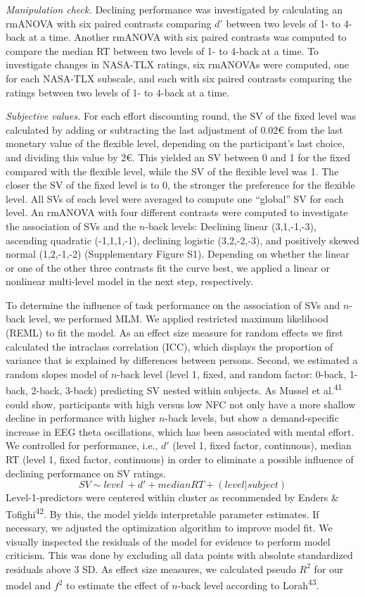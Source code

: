 \documentclass[
  man,floatsintext]{apa6}
\begin{document}
\emph{Manipulation check.}
Declining performance was investigated by calculating an rmANOVA with six paired contrasts comparing \(d'\) between two levels of 1- to 4-back at a time.
Another rmANOVA with six paired contrasts was computed to compare the median RT between two levels of 1- to 4-back at a time.
To investigate changes in NASA-TLX ratings, six rmANOVAs were computed, one for each NASA-TLX subscale, and each with six paired contrasts comparing the ratings between two levels of 1- to 4-back at a time.

\emph{Subjective values.}
For each effort discounting round, the SV of the fixed level was calculated by adding or subtracting the last adjustment of 0.02€ from the last monetary value of the flexible level, depending on the participant's last choice, and dividing this value by 2€.
This yielded an SV between 0 and 1 for the fixed compared with the flexible level, while the SV of the flexible level was 1.
The closer the SV of the fixed level is to 0, the stronger the preference for the flexible level.
All SVs of each level were averaged to compute one ``global'' SV for each level.
An rmANOVA with four different contrasts were computed to investigate the association of SVs and the \(n\)-back levels: Declining linear (3,1,-1,-3), ascending quadratic (-1,1,1,-1), declining logistic (3,2,-2,-3), and positively skewed normal (1,2,-1,-2) (Supplementary Figure S1).
Depending on whether the linear or one of the other three contrasts fit the curve best, we applied a linear or nonlinear multi-level model in the next step, respectively.

To determine the influence of task performance on the association of SVs and \(n\)-back level, we performed MLM.
We applied restricted maximum likelihood (REML) to fit the model.
As an effect size measure for random effects we first calculated the intraclass correlation (ICC), which displays the proportion of variance that is explained by differences between persons.
Second, we estimated a random slopes model of \(n\)-back level (level 1, fixed, and random factor: 0-back, 1-back, 2-back, 3-back) predicting SV nested within subjects.
As Mussel et al.\textsuperscript{41} could show, participants with high versus low NFC not only have a more shallow decline in performance with higher \(n\)-back levels, but show a demand-specific increase in EEG theta oscillations, which has been associated with mental effort.
We controlled for performance, i.e., \(d'\) (level 1, fixed factor, continuous), median RT (level 1, fixed factor, continuous) in order to eliminate a possible influence of declining performance on SV ratings.
\[
SV \sim level\ + d' + median RT + (level|subject)
\]
Level-1-predictors were centered within cluster as recommended by Enders \& Tofighi\textsuperscript{42}.
By this, the model yields interpretable parameter estimates.
If necessary, we adjusted the optimization algorithm to improve model fit.
We visually inspected the residuals of the model for evidence to perform model criticism.
This was done by excluding all data points with absolute standardized residuals above 3 SD.
As effect size measures, we calculated pseudo \(R^{2}\) for our model and \(f^{2}\) to estimate the effect of \(n\)-back level according to Lorah\textsuperscript{43}.
\end{document}
